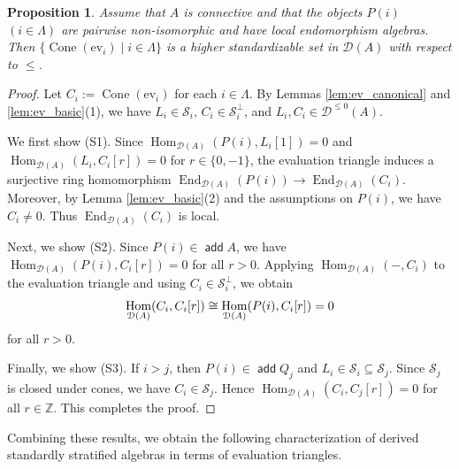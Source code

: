 \documentclass[a4paper,reqno,11pt]{amsart}
\numberwithin{equation}{section}
\newtheorem{proposition}[theorem]{Proposition}
\theoremstyle{definition}
\newcommand{\D}{\mathcal{D}}
\renewcommand{\S}{\mathcal{S}}
\newcommand{\ZZ}{\mathbb{Z}}
\newcommand{\ev}{\mathrm{ev}}
\DeclareMathOperator{\Co}{Cone}
\DeclareMathOperator{\add}{\mathsf{add}}
\DeclareMathOperator{\End}{End}
\DeclareMathOperator{\Hom}{Hom}
\begin{document}
\begin{proposition}\label{prop:ev_hss}
Assume that $A$ is connective and that the objects $P(i)$ $(i\in\Lambda)$ are pairwise non-isomorphic and have local endomorphism algebras.
Then $\{\Co(\ev_{i})\mid i\in\Lambda\}$ is a higher standardizable set in $\D(A)$ with respect to $\leq$.
\end{proposition}
\begin{proof}
Let $C_{i}:=\Co(\ev_{i})$ for each $i\in\Lambda$.
By Lemmas \ref{lem:ev_canonical} and \ref{lem:ev_basic}(1), we have $L_{i}\in\S_{i}$, $C_{i}\in\S_{i}^{\perp}$, and $L_{i},C_{i}\in\D^{\leq 0}(A)$.

We first show (S1).
Since $\Hom_{\D(A)}(P(i),L_{i}[1])=0$ and $\Hom_{\D(A)}(L_{i},C_{i}[r])=0$ for $r\in \{0,-1\}$, the evaluation triangle induces a surjective ring homomorphism $\End_{\D(A)}(P(i))\to\End_{\D(A)}(C_{i})$.
Moreover, by Lemma \ref{lem:ev_basic}(2) and the assumptions on $P(i)$, we have $C_{i}\neq 0$.
Thus $\End_{\D(A)}(C_{i})$ is local.

Next, we show (S2).
Since $P(i)\in\add A$, we have $\Hom_{\D(A)}(P(i),C_{i}[r])=0$ for all $r>0$.
Applying $\Hom_{\D(A)}(-,C_{i})$ to the evaluation triangle and using $C_{i}\in\S_{i}^{\perp}$, we obtain
\begin{align}
\Hom_{\D(A)}(C_{i},C_{i}[r]) \cong\Hom_{\D(A)}(P(i),C_{i}[r])=0\notag
\end{align}
for all $r>0$.

Finally, we show (S3).
If $i>j$, then $P(i)\in\add Q_{j}$ and $L_{i}\in \S_{i}\subseteq\S_{j}$.
Since $\S_{j}$ is closed under cones, we have $C_{i}\in \S_{j}$.
Hence $\Hom_{\D(A)}(C_{i},C_{j}[r])=0$ for all $r\in \ZZ$.
This completes the proof.
\end{proof}

Combining these results, we obtain the following characterization of derived standardly stratified algebras in terms of evaluation triangles.
\end{document}
